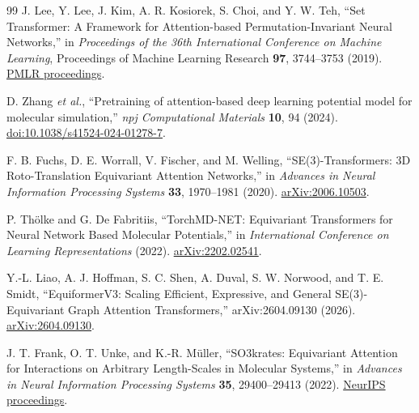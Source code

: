 \documentclass[aps,prx,preprint,notitlepage,superscriptaddress,nofootinbib,floatfix]{revtex4-2}
\newif\ifshowrevisions
\newcommand{\draftfive}[1]{%
  \ifshowrevisions\textcolor{draftfivecolor}{#1}\else#1\fi}
\newcommand{\drafttwelve}[1]{%
  \ifshowrevisions\textcolor{drafttwelvecolor}{#1}\else#1\fi}
\newcommand{\draftthirty}[1]{%
  \ifshowrevisions\textcolor{draftthirtycolor}{#1}\else#1\fi}
\begin{document}
\begin{thebibliography}{99}
\draftthirty{J. Lee, Y. Lee, J. Kim, A. R. Kosiorek, S. Choi, and Y. W. Teh,
``Set Transformer: A Framework for Attention-based Permutation-Invariant
Neural Networks,'' in \emph{Proceedings of the 36th International Conference
on Machine Learning}, Proceedings of Machine Learning Research \textbf{97},
3744--3753 (2019).
\href{https://proceedings.mlr.press/v97/lee19d.html}{PMLR proceedings}.}

D. Zhang \emph{et al.},
``Pretraining of attention-based deep learning potential model for molecular
simulation,'' \emph{npj Computational Materials} \textbf{10}, 94 (2024).
\href{https://doi.org/10.1038/s41524-024-01278-7}{doi:10.1038/s41524-024-01278-7}.

\drafttwelve{F. B. Fuchs, D. E. Worrall, V. Fischer, and M. Welling,
``SE(3)-Transformers: 3D Roto-Translation Equivariant Attention Networks,''
in \emph{Advances in Neural Information Processing Systems} \textbf{33},
1970--1981 (2020).
\href{https://arxiv.org/abs/2006.10503}{arXiv:2006.10503}.}

\drafttwelve{P. Th\"olke and G. De Fabritiis,
``TorchMD-NET: Equivariant Transformers for Neural Network Based Molecular
Potentials,'' in \emph{International Conference on Learning Representations}
(2022).
\href{https://arxiv.org/abs/2202.02541}{arXiv:2202.02541}.}

Y.-L. Liao, A. J. Hoffman, S. C. Shen, A. Duval, S. W. Norwood, and T. E.
Smidt,
``EquiformerV3: Scaling Efficient, Expressive, and General
SE(3)-Equivariant Graph Attention Transformers,'' arXiv:2604.09130 (2026).
\href{https://arxiv.org/abs/2604.09130}{arXiv:2604.09130}.

\draftfive{J. T. Frank, O. T. Unke, and K.-R. M\"uller,
``SO3krates: Equivariant Attention for Interactions on Arbitrary Length-Scales
in Molecular Systems,'' in \emph{Advances in Neural Information Processing
Systems} \textbf{35}, 29400--29413 (2022).
\href{https://proceedings.neurips.cc/paper_files/paper/2022/hash/bcf4ca90a8d405201d29dd47d75ac896-Abstract-Conference.html}{NeurIPS proceedings}.}



\end{thebibliography}
\end{document}

